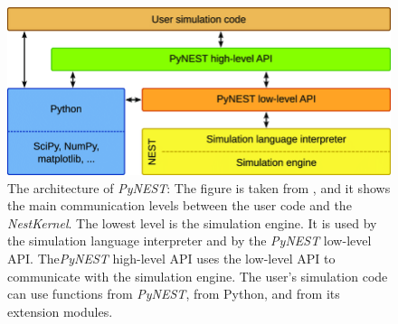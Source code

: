 \begin{figure}[ht!]
\centering
\includegraphics[width=1\textwidth,height=1\textheight,keepaspectratio]{src/pic/The-architecture-of-PyNEST-The-lowest-level-is-the-simulation-engine-It-is-used-by.png}
\caption{The architecture of \emph{PyNEST}: The figure is taken from \citep{epp}, and it shows the main communication levels between the user code and the \emph{NestKernel}. The lowest level is the simulation engine. It is used by
the simulation language interpreter and by the \emph{PyNEST} low-level API. The\emph{PyNEST} high-level
API uses the low-level API to communicate with the simulation engine. The user’s simulation
code can use functions from \emph{PyNEST}, from Python, and from its extension modules.}
\label{fig:pynest}
\end{figure}




